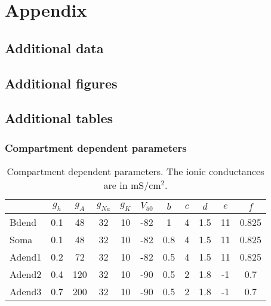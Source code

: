 \chapter{Appendix}\label{ch:appendix_b}

\section{Additional data}

\section{Additional figures}

\section{Additional tables}
\subsection{Compartment dependent parameters}
\begin{table}[htbp]
    \centering
    \caption[Compartment dependent parameters]{Compartment dependent parameters. The ionic conductances are in mS/cm\(^2\).}\label{table:compartment_dependent_parameters}
    \begin{tabular}{l|cccccccccc}
        \hline
        \hline
               & \( g_{h} \) & \( g_{A} \) & \( g_{Na} \) & \( g_{K} \) & \( V_{50} \) & \( b \) & \( c \) & \( d \) & \( e \) & \( f \) \\
        \hline
        Bdend  & 0.1         & 48          & 32           & 10          & -82          & 1       & 4       & 1.5     & 11      & 0.825   \\
        Soma   & 0.1         & 48          & 32           & 10          & -82          & 0.8     & 4       & 1.5     & 11      & 0.825   \\
        Adend1 & 0.2         & 72          & 32           & 10          & -82          & 0.5     & 4       & 1.5     & 11      & 0.825   \\
        Adend2 & 0.4         & 120         & 32           & 10          & -90          & 0.5     & 2       & 1.8     & -1      & 0.7     \\
        Adend3 & 0.7         & 200         & 32           & 10          & -90          & 0.5     & 2       & 1.8     & -1      & 0.7     \\
        \hline
        \hline
    \end{tabular}
\end{table}

